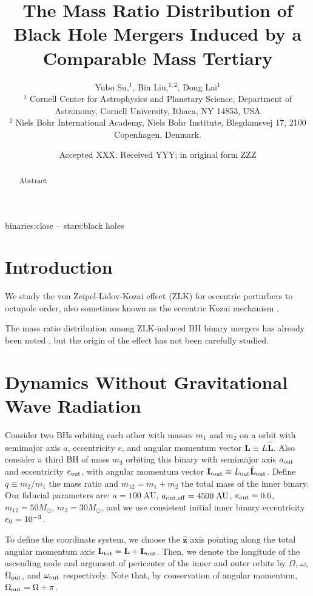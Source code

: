 \documentclass[
        fleqn,
        usenatbib,
    ]{mnras}
\title[Mass Ratio Distribution]{The Mass Ratio Distribution of
Black Hole Mergers Induced by a Comparable Mass Tertiary}
\author[Y. Su et\ al.]{
Yubo Su,$^1$,
Bin Liu,$^{1,2}$,
Dong Lai$^1$
\\
$^1$ Cornell Center for Astrophysics and Planetary Science, Department of
Astronomy, Cornell University, Ithaca, NY 14853, USA\\
$^2$ Niels Bohr International Academy, Niels Bohr Institute, Blegdamsvej 17,
2100 Copenhagen, Denmark.
}
\date{Accepted XXX\@. Received YYY\@; in original form ZZZ}
\newcommand*{\bm}[1]{\mathbf{#1}}
\newcommand*{\uv}[1]{\hat{\mathbf{#1}}}
\begin{document}
\label{firstpage}
\pagerange{\pageref{firstpage}--\pageref{lastpage}}
\maketitle

\begin{abstract}
    Abstract
\end{abstract}

\begin{keywords}
binaries:close -- stars:black holes %
\end{keywords}

\section{Introduction}\label{s:intro}

We study the von Zeipel-Lidov-Kozai effect (ZLK) for eccentric perturbers to
octupole order, also sometimes known as the eccentric Kozai mechanism
\citep[e.g.][]{lithwick2011eccentric}.

The mass ratio distribution among ZLK-induced BH binary mergers has already been
noted \citep[see Fig.~10 of][]{silsbee2017lidov}, but the origin of the effect
has not been carefully studied.

\section{Dynamics Without Gravitational Wave Radiation}\label{s:background}

Consider two BHs orbiting each other with masses $m_1$ and $m_2$ on a orbit with
semimajor axis $a$, eccentricity $e$, and angular momentum vector $\bm{L} \equiv
L\uv{L}$. Also consider a third BH of mass $m_3$ orbiting this binary with
semimajor axis $a_{\rm out}$ and eccentricity $e_{\rm out}$, with angular
momentum vector $\bm{L}_{\rm out} \equiv L_{\rm out} \uv{L}_{\rm out}$. Define
$q \equiv m_2 / m_1$ the mass ratio and $m_{12} = m_1 + m_2$ the total mass of
the inner binary. Our fiducial parameters are: $a = 100\;\mathrm{AU}$, $a_{\rm
out, eff} = 4500\;\mathrm{AU}$, $e_{\rm out} = 0.6$, $m_{12} = 50M_{\odot}$,
$m_3 = 30M_{\odot}$, and we use consistent initial inner binary eccentricity
$e_{\rm 0} = 10^{-3}$.

To define the coordinate system, we choose the $\uv{z}$ axis pointing along the
total angular momentum axis $\bm{L}_{\rm tot} = \bm{L} + \bm{L}_{\rm out}$.
Then, we denote the longitude of the ascending node and argument
of pericenter of the inner and outer orbits by $\Omega$, $\omega$, $\Omega_{\rm
out}$, and $\omega_{\rm out}$ respectively. Note that, by conservation of
angular momentum, $\Omega_{\rm out} = \Omega + \pi$.
\end{document}

